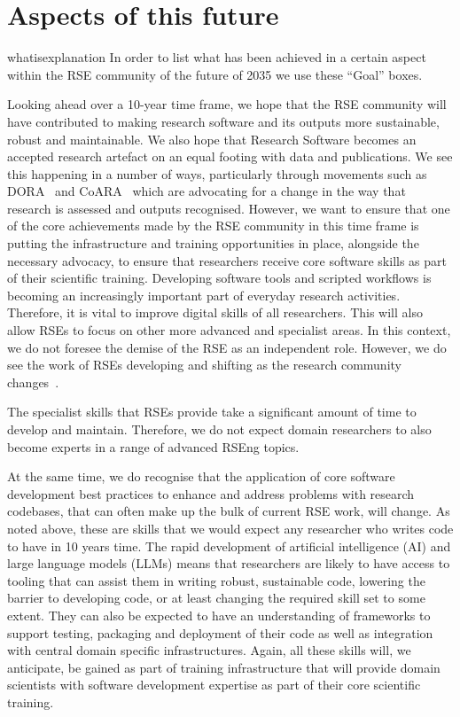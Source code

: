 \documentclass{eceasst}
\begin{document}
\section{Aspects of this future}
\begin{whatis}{}{whatisexplanation}
In order to list what has been achieved in a certain aspect within the RSE community of the future of 2035 we use these ``Goal'' boxes.
\end{whatis}

Looking ahead over a 10-year time frame, we hope that the RSE community will have
contributed to making research software and its outputs
more sustainable, robust and maintainable.
We also hope that Research Software becomes an accepted research artefact on an equal footing with data and publications.
We see this happening in a number of ways,
particularly through movements such as DORA~\cite{DORA} and CoARA~\cite{COARA} which are advocating for a change in the way that research is assessed and outputs recognised.
However, we want to ensure that one of the core achievements made by the RSE community in this time
frame is putting the infrastructure and training opportunities in place, alongside the necessary
advocacy, to ensure that researchers receive core software skills as part of their scientific training.
Developing software tools and scripted workflows is becoming an increasingly important part of everyday
research activities.
Therefore, it is vital to improve digital skills of all researchers.
This will also allow RSEs to focus on other more advanced and specialist areas.
In this context, we do not foresee the demise of the RSE as an independent role.
However, we do see the work of RSEs developing and shifting as the research community changes~\cite{ChueHong2025}.

The specialist skills that RSEs provide take a significant amount of time to develop and maintain.
Therefore, we do not expect domain researchers to also become experts in a range of
advanced RSEng topics. 

At the same time, we do recognise that the application of core software development best practices
to enhance and address problems with research codebases, that can often make up the bulk of
current RSE work, will change. As noted above, these are skills that we
would expect any researcher who writes code to have in 10 years time. 
The rapid development of artificial intelligence (AI) and large language models
(LLMs) means that researchers are likely to have access to tooling that can assist
them in writing robust, sustainable code, lowering the barrier to developing code,
or at least changing the required skill set to some extent.
They can also be expected to have an understanding of frameworks to support testing, packaging and
deployment of their code as well as integration with central domain specific infrastructures.
Again, all these skills will, we anticipate, be gained as part of training infrastructure that will
provide domain scientists with software development expertise as part of their core scientific training.
\end{document}
